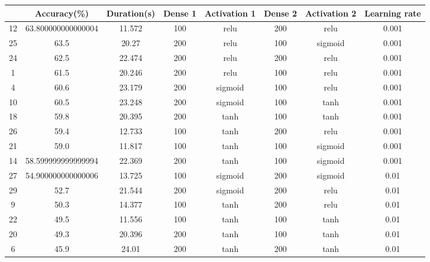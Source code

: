 \begin{table}[h]
\centering
\begin{tabular}{@{}cccccccc@{}}
\toprule
   & Accuracy(\%)       & Duration(s) & Dense 1 & Activation 1 & Dense 2 & Activation 2 & Learning rate \\ \midrule
12 & 63.800000000000004 & 11.572      & 100     & relu         & 200     & relu         & 0.001         \\
25 & 63.5               & 20.27       & 200     & relu         & 100     & sigmoid      & 0.001         \\
24 & 62.5               & 22.474      & 200     & relu         & 200     & relu         & 0.001         \\
1  & 61.5               & 20.246      & 200     & relu         & 100     & relu         & 0.001         \\
4  & 60.6               & 23.179      & 200     & sigmoid      & 100     & relu         & 0.001         \\
10 & 60.5               & 23.248      & 200     & sigmoid      & 100     & tanh         & 0.001         \\
18 & 59.8               & 20.395      & 200     & tanh         & 100     & tanh         & 0.001         \\
26 & 59.4               & 12.733      & 100     & tanh         & 200     & relu         & 0.001         \\
21 & 59.0               & 11.817      & 100     & tanh         & 100     & sigmoid      & 0.001         \\
14 & 58.599999999999994 & 22.369      & 200     & tanh         & 100     & sigmoid      & 0.001         \\
27 & 54.900000000000006 & 13.725      & 100     & sigmoid      & 200     & sigmoid      & 0.01          \\
29 & 52.7               & 21.544      & 200     & sigmoid      & 200     & relu         & 0.01          \\
9  & 50.3               & 14.377      & 100     & tanh         & 200     & relu         & 0.01          \\
22 & 49.5               & 11.556      & 100     & tanh         & 100     & tanh         & 0.01          \\
20 & 49.3               & 20.396      & 200     & tanh         & 100     & tanh         & 0.01          \\
6  & 45.9               & 24.01       & 200     & tanh         & 200     & tanh         & 0.01          \\

\end{tabular}
\end{table}
